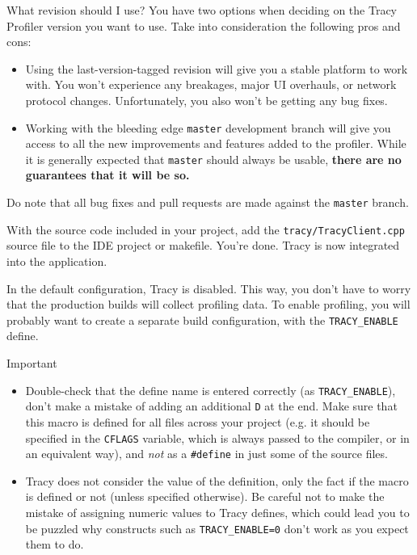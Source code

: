 \documentclass[hidelinks,titlepage,a4paper]{article}
\begin{document}
\begin{bclogo}[
noborder=true,
couleur=black!5,
logo=\bclampe
]{What revision should I use?}
You have two options when deciding on the Tracy Profiler version you want to use. Take into consideration the following pros and cons:

\begin{itemize}
\item Using the last-version-tagged revision will give you a stable platform to work with. You won't experience any breakages, major UI overhauls, or network protocol changes. Unfortunately, you also won't be getting any bug fixes.
\item Working with the bleeding edge \texttt{master} development branch will give you access to all the new improvements and features added to the profiler. While it is generally expected that \texttt{master} should always be usable, \textbf{there are no guarantees that it will be so.}
\end{itemize}

Do note that all bug fixes and pull requests are made against the \texttt{master} branch.
\end{bclogo}

With the source code included in your project, add the \texttt{tracy/TracyClient.cpp} source file to the IDE project or makefile. You're done. Tracy is now integrated into the application.

In the default configuration, Tracy is disabled. This way, you don't have to worry that the production builds will collect profiling data. To enable profiling, you will probably want to create a separate build configuration, with the \texttt{TRACY\_ENABLE} define.

\begin{bclogo}[
noborder=true,
couleur=black!5,
logo=\bcbombe
]{Important}
\begin{itemize}
\item Double-check that the define name is entered correctly (as \texttt{TRACY\_ENABLE}), don't make a mistake of adding an additional \texttt{D} at the end. Make sure that this macro is defined for all files across your project (e.g. it should be specified in the \texttt{CFLAGS} variable, which is always passed to the compiler, or in an equivalent way), and \emph{not} as a \texttt{\#define} in just some of the source files.
\item Tracy does not consider the value of the definition, only the fact if the macro is defined or not (unless specified otherwise). Be careful not to make the mistake of assigning numeric values to Tracy defines, which could lead you to be puzzled why constructs such as \texttt{TRACY\_ENABLE=0} don't work as you expect them to do.
\end{itemize}
\end{bclogo}
\end{document}
